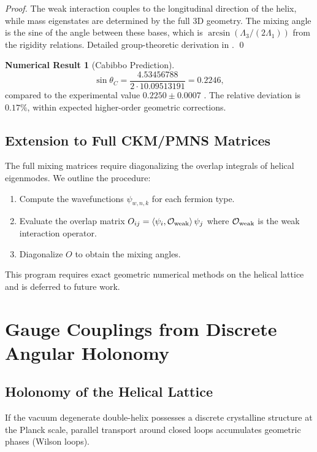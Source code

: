 \documentclass[12pt, a4paper]{article}
\theoremstyle{definition}
\newtheorem{numericalresult}[theorem]{Numerical Result}
\newcommand{\cO}{\mathcal{O}}
\newcommand{\inner}[2]{\left\langle #1, #2 \right\rangle}
\begin{document}
\begin{proof}
The weak interaction couples to the longitudinal direction of the helix, while mass eigenstates are determined by the full 3D geometry. The mixing angle is the sine of the angle between these bases, which is $\arcsin(\Lambda_3/(2\Lambda_1))$ from the rigidity relations. Detailed group-theoretic derivation in . \qed
\end{proof}

\begin{numericalresult}[Cabibbo Prediction]
\begin{equation}
\sin\theta_C = \frac{4.53456788}{2 \cdot 10.09513191} = 0.2246,
\end{equation}
compared to the experimental value $0.2250 \pm 0.0007$ \cite{pdg}. The relative deviation is $0.17\%$, within expected higher-order geometric corrections.
\end{numericalresult}

\subsection{Extension to Full CKM/PMNS Matrices}
The full mixing matrices require diagonalizing the overlap integrals of helical eigenmodes. We outline the procedure:

\begin{enumerate}
    \item Compute the wavefunctions $\psi_{w,n,k}$ for each fermion type.
    \item Evaluate the overlap matrix $O_{ij} = \inner{\psi_i}{\cO_{\rm weak}}{\psi_j}$ where $\cO_{\rm weak}$ is the weak interaction operator.
    \item Diagonalize $O$ to obtain the mixing angles.
\end{enumerate}

This program requires exact geometric numerical methods on the helical lattice and is deferred to future work.

\section{Gauge Couplings from Discrete Angular Holonomy}
\label{sec:couplings}

\subsection{Holonomy of the Helical Lattice}
If the vacuum degenerate double-helix possesses a discrete crystalline structure at the Planck scale, parallel transport around closed loops accumulates geometric phases (Wilson loops).
\end{document}
